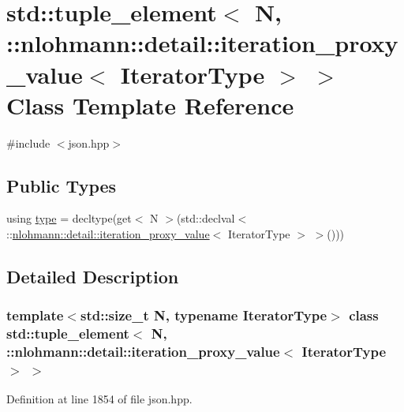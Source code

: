 \hypertarget{classstd_1_1tuple__element_3_01_n_00_01_1_1nlohmann_1_1detail_1_1iteration__proxy__value_3_01_iterator_type_01_4_01_4}{}\section{std\+::tuple\+\_\+element$<$ N, \+::nlohmann\+::detail\+::iteration\+\_\+proxy\+\_\+value$<$ Iterator\+Type $>$ $>$ Class Template Reference}
\label{classstd_1_1tuple__element_3_01_n_00_01_1_1nlohmann_1_1detail_1_1iteration__proxy__value_3_01_iterator_type_01_4_01_4}


{\ttfamily \#include $<$json.\+hpp$>$}

\subsection*{Public Types}
\begin{DoxyCompactItemize}
\item 
using \mbox{\hyperlink{classstd_1_1tuple__element_3_01_n_00_01_1_1nlohmann_1_1detail_1_1iteration__proxy__value_3_01_iterator_type_01_4_01_4_ace1dfdb74841c2f58c064a50598188fd}{type}} = decltype(get$<$ N $>$(std\+::declval$<$ \+::\mbox{\hyperlink{classnlohmann_1_1detail_1_1iteration__proxy__value}{nlohmann\+::detail\+::iteration\+\_\+proxy\+\_\+value}}$<$ Iterator\+Type $>$ $>$()))
\end{DoxyCompactItemize}


\subsection{Detailed Description}
\subsubsection*{template$<$std\+::size\+\_\+t N, typename Iterator\+Type$>$\newline
class std\+::tuple\+\_\+element$<$ N, \+::nlohmann\+::detail\+::iteration\+\_\+proxy\+\_\+value$<$ Iterator\+Type $>$ $>$}



Definition at line 1854 of file json.\+hpp.



